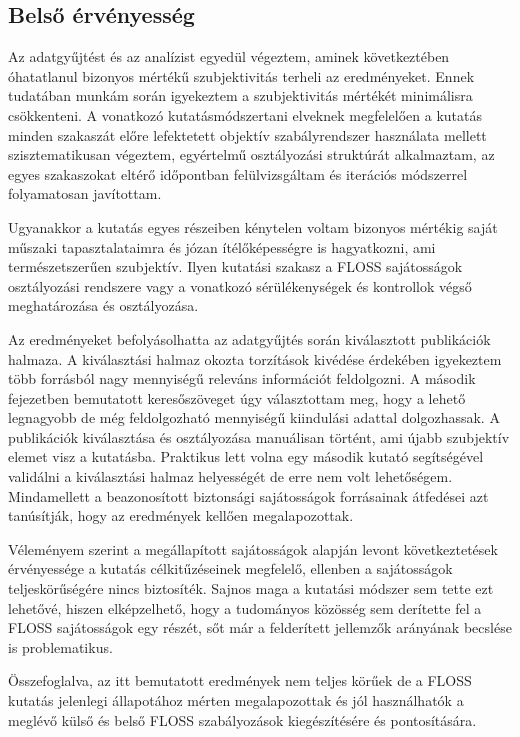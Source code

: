 \documentclass[12pt,magyar,a4paper,oneside]{scrreprt}
\begin{document}
\hypertarget{belsux151-uxe9rvuxe9nyessuxe9g}{%
\subsection{Belső érvényesség}\label{belsux151-uxe9rvuxe9nyessuxe9g}}

Az adatgyűjtést és az analízist egyedül végeztem, aminek következtében
óhatatlanul bizonyos mértékű szubjektivitás terheli az eredményeket.
Ennek tudatában munkám során igyekeztem a szubjektivitás mértékét
minimálisra csökkenteni. A vonatkozó kutatásmódszertani elveknek
megfelelően a kutatás minden szakaszát előre lefektetett objektív
szabályrendszer használata mellett szisztematikusan végeztem, egyértelmű
osztályozási struktúrát alkalmaztam, az egyes szakaszokat eltérő
időpontban felülvizsgáltam és iterációs módszerrel folyamatosan
javítottam.

Ugyanakkor a kutatás egyes részeiben kénytelen voltam bizonyos mértékig
saját műszaki tapasztalataimra és józan ítélőképességre is hagyatkozni,
ami természetszerűen szubjektív. Ilyen kutatási szakasz a FLOSS
sajátosságok osztályozási rendszere vagy a vonatkozó sérülékenységek és
kontrollok végső meghatározása és osztályozása.

Az eredményeket befolyásolhatta az adatgyűjtés során kiválasztott
publikációk halmaza. A kiválasztási halmaz okozta torzítások kivédése
érdekében igyekeztem több forrásból nagy mennyiségű releváns információt
feldolgozni. A második fejezetben bemutatott keresőszöveget úgy
választottam meg, hogy a lehető legnagyobb de még feldolgozható
mennyiségű kiindulási adattal dolgozhassak. A publikációk kiválasztása
és osztályozása manuálisan történt, ami újabb szubjektív elemet visz a
kutatásba. Praktikus lett volna egy második kutató segítségével
validálni a kiválasztási halmaz helyességét de erre nem volt
lehetőségem. Mindamellett a beazonosított biztonsági sajátosságok
forrásainak átfedései azt tanúsítják, hogy az eredmények kellően
megalapozottak.

Véleményem szerint a megállapított sajátosságok alapján levont
következtetések érvényessége a kutatás célkitűzéseinek megfelelő,
ellenben a sajátosságok teljeskörűségére nincs biztosíték. Sajnos maga a
kutatási módszer sem tette ezt lehetővé, hiszen elképzelhető, hogy a
tudományos közösség sem derítette fel a FLOSS sajátosságok egy részét,
sőt már a felderített jellemzők arányának becslése is problematikus.

Összefoglalva, az itt bemutatott eredmények nem teljes körűek de a FLOSS
kutatás jelenlegi állapotához mérten megalapozottak és jól használhatók
a meglévő külső és belső FLOSS szabályozások kiegészítésére és
pontosítására.
\end{document}
